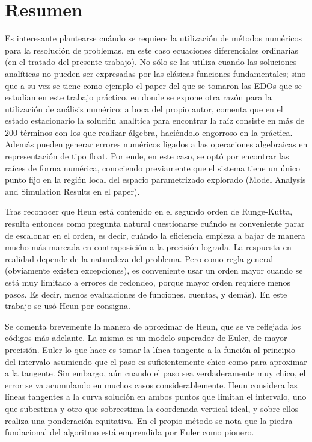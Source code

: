 \section{Resumen}

	\hspace{1cm}Es interesante plantearse cu\'ando se requiere la utilizaci\'on de m\'etodos num\'ericos para la resolución de problemas, en este caso ecuaciones diferenciales ordinarias (en el tratado del presente trabajo). No sólo se las utiliza cuando las soluciones analíticas no pueden ser expresadas por las clásicas funciones fundamentales; sino que a su vez se tiene como ejemplo el paper del que se tomaron las EDOs que se estudian en este trabajo práctico, en donde se expone otra razón para la utilización de análisis numérico: a boca del propio autor, comenta que en el estado estacionario la solución analítica para encontrar la raíz consiste en más de 200 términos con los que realizar álgebra, haciéndolo engorroso en la práctica. Además pueden generar errores numéricos ligados a las operaciones algebraicas en representación de tipo float. Por ende, en este caso, se optó por encontrar las raíces de forma numérica, conociendo previamente que el sistema tiene un único punto fijo en la región local del espacio parametrizado explorado (Model Analysis and Simulation Results en el paper).

\hspace{1cm}Tras reconocer que Heun está contenido en el segundo orden de Runge-Kutta, resulta entonces como pregunta natural cuestionarse cuándo es conveniente parar de escalonar en el orden, es decir, cuándo la eficiencia empieza a bajar de manera mucho más marcada en contraposición a la precisión lograda. La respuesta en realidad depende de la naturaleza del problema. Pero como regla general (obviamente existen excepciones), es conveniente usar un orden mayor cuando se está muy limitado a errores de redondeo, porque mayor orden requiere menos pasos. Es decir, menos evaluaciones de funciones, cuentas, y demás). En este trabajo se usó Heun por consigna.

\hspace{1cm}Se comenta brevemente la manera de aproximar de Heun, que se ve reflejada los códigos m\'as adelante. La misma es un modelo superador de Euler, de mayor precisión. Euler lo que hace es tomar la línea tangente a la función al principio del intervalo asumiendo que el paso es suficientemente chico como para aproximar a la tangente. Sin embargo, aún cuando el paso sea verdaderamente muy chico, el error se va acumulando en muchos casos considerablemente. Heun considera las líneas tangentes a la curva solución en ambos puntos que limitan el intervalo, uno que subestima y otro que sobreestima la coordenada vertical ideal, y sobre ellos realiza una ponderación equitativa. En el propio método se nota que la piedra fundacional del algoritmo está emprendida por Euler como pionero.

